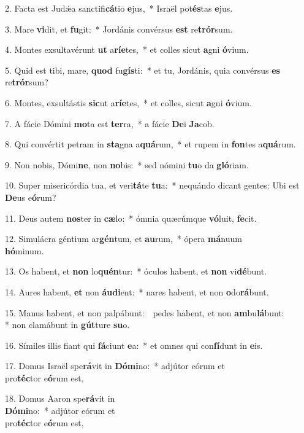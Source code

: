 2. Facta est Jud\'{\ae}a sanctifi\textbf{cá}tio \textbf{e}jus,~* 
	Israël pot\textbf{és}tas \textbf{e}jus.

3. Mare \textbf{vi}dit, et \textbf{fu}git:~* 
	Jordánis convérsus \textbf{est} re\textbf{trór}sum.

4. Montes exsultavérunt \textbf{ut} a\textbf{rí}\textbf{e}tes,~* 
	et colles sicut \textbf{a}gni \textbf{ó}vium.

5. Quid est tibi, mare, \textbf{quod} fu\textbf{gís}ti:~* 
	et tu, Jordánis, quia convérsus \textbf{es} re\textbf{trór}sum?

6. Montes, exsultástis \textbf{sic}ut a\textbf{rí}\textbf{e}tes,~* 
	et colles, sicut \textbf{a}gni \textbf{ó}vium.

7. A fácie Dómini \textbf{mo}ta est \textbf{ter}ra,~* 
	a fácie \textbf{De}i \textbf{Ja}cob.

8. Qui convértit petram in \textbf{sta}gna a\textbf{quá}rum,~* 
	et rupem in \textbf{fon}tes a\textbf{quá}rum.

9. Non nobis, Dómi\textbf{ne}, non \textbf{no}bis:~* 
	sed nómini \textbf{tu}o da \textbf{gló}riam.

10. Super misericórdia tua, et veri\textbf{tá}te \textbf{tu}a:~* 
	nequándo dicant gentes: Ubi est \textbf{De}us e\textbf{ó}rum?

11. Deus autem \textbf{nos}ter in \textbf{cæ}lo:~* 
	ómnia quæcúmque \textbf{vó}luit, \textbf{fe}cit.

12. Simulácra géntium ar\textbf{gén}tum, et \textbf{au}rum,~* 
	ópera \textbf{má}nuum\\ \textbf{hó}minum.

13. Os habent, et \textbf{non} lo\textbf{quén}tur:~* 
	óculos habent, et \textbf{non} vi\textbf{dé}bunt.

14. Aures habent, \textbf{et} non \textbf{áu}\textbf{di}ent:~* 
	nares habent, et non \textbf{o}do\textbf{rá}bunt.

15. Manus habent, et non palpábunt:~{\color{red}\GreDagger}\ pedes habent, et non \textbf{am}bu\textbf{lá}bunt:\\ * 
	non clamábunt in \textbf{gút}ture \textbf{su}o.

16. Símiles illis fiant qui \textbf{fá}ciunt \textbf{e}a:~* 
	et omnes qui con\textbf{fí}dunt in \textbf{e}is.

17. Domus Israël spe\textbf{rá}vit in \textbf{Dó}\textbf{mi}no:~* 
	adjútor eórum et\\ pro\textbf{téc}tor e\textbf{ó}rum est,

18. Domus Aaron spe\textbf{rá}vit in\\ \textbf{Dó}\textbf{mi}no:~* 
	adjútor eórum et\\ pro\textbf{téc}tor e\textbf{ó}rum est,

